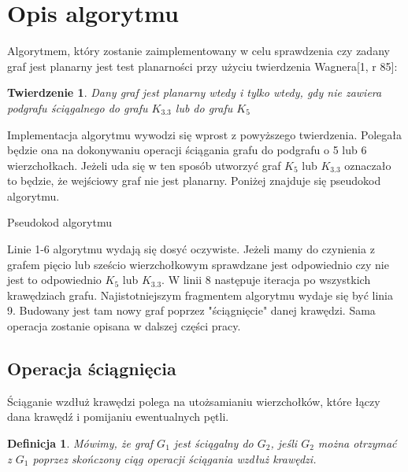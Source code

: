 \documentclass[a4 122pt]{article}
\newtheorem{twierdzenie}{Twierdzenie}
\newtheorem{definicja}{Definicja}
\newenvironment{algorytm}[1][htb]
  {\renewcommand{\algorithmcfname}{Algorytm}%
   \begin{algorithm}[#1]%
  }{\end{algorithm}}
\begin{document}
	\pagebreak

	\section{Opis algorytmu}	
	Algorytmem, który zostanie zaimplementowany w celu sprawdzenia czy zadany graf jest planarny jest test planarności przy użyciu twierdzenia Wagnera[1, r 85]:
	\begin{twierdzenie}
	Dany graf jest planarny wtedy i tylko wtedy, gdy nie zawiera podgrafu ściągalnego do grafu $K_{3.3}$ lub do grafu $ K_5 $
	\end{twierdzenie}
	Implementacja algorytmu wywodzi się wprost z powyższego twierdzenia. 
	Polegała będzie ona na dokonywaniu operacji ściągania grafu do podgrafu o 5 lub 6 wierzchołkach.
	Jeżeli uda się w ten sposób utworzyć graf $ K_5 $ lub $K_{3.3}$ oznaczało to będzie, że wejściowy graf nie jest planarny.
	Poniżej znajduje się pseudokod algorytmu.
	
	\begin{algorytm}[H]
	\newcommand{\forcond}{$i=0$ \KwTo $n$}
	\caption{Pseudokod algorytmu}
	\end{algorytm}
	
	Linie 1-6 algorytmu wydają się dosyć oczywiste. 
	Jeżeli mamy do czynienia z grafem pięcio lub sześcio wierzchołkowym sprawdzane jest odpowiednio czy nie jest to odpowiednio $K_5$ lub $K_{3.3}$. 
	W linii 8 następuje iteracja po wszystkich krawędziach grafu. 
	Najistotniejszym fragmentem algorytmu wydaje się być linia 9. 
	Budowany jest tam nowy graf poprzez "ściągnięcie" danej krawędzi. 
	Sama operacja zostanie opisana w dalszej części pracy.
	
	\subsection{Operacja ściągnięcia}
		Ściąganie wzdłuż krawędzi polega na utożsamianiu wierzchołków, które łączy dana krawędź i pomijaniu ewentualnych pętli. 
 		
		\begin{definicja}
			Mówimy, że graf $G_1$ jest ściągalny do $G_2$, jeśli $G_2$ można otrzymać z $G_1$ poprzez skończony ciąg operacji ściągania wzdłuż krawędzi.
		\end{definicja}
		
\end{document}
